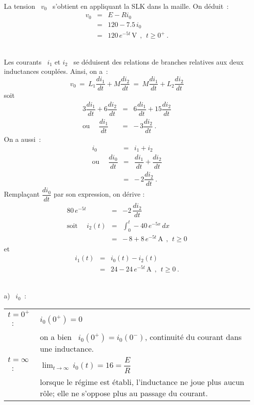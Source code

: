 \newpage

\\
La tension \ $v_0$ \ s'obtient en appliquant la SLK dans la maille. On déduit~:
\begin{eqnarray*}
	v_0 &=& E - Ri_0\\
	&=& 120 - 7.5\, i_0\\
	&=& 120 \, e^{-5t} \, \mbox{V}~~,~~t \geq 0^+~. 
\end{eqnarray*}

\\
Les courants \ $i_1$ et $i_2$ \ se déduisent des relations de branches
relatives aux deux inductances couplées. Ainsi, on a~:
\[ v_0 \: = \: L_1 \dfrac{di_1}{dt} + M \dfrac{di_2}{dt} 
\: = \: M \dfrac{di_1}{dt} + L_2 \dfrac{di_2}{dt} \]
soit
\begin{eqnarray*}
	3 \dfrac{di_1}{dt} + 6\dfrac{di_2}{dt} &=&  6\dfrac{di_1}{dt} + 15 \dfrac{di_2}{dt}\\
	\mbox{ou}~~~~~~\dfrac{di_1}{dt} &=& -\, 3 \dfrac{di_2}{dt}~.
\end{eqnarray*}
On a aussi~: 
\begin{eqnarray*}
	i_0 &=& i_1+i_2\\
	\mbox{ou}~~~~~~\dfrac{di_0}{dt} &=& \dfrac{di_1}{dt} + \dfrac{di_2}{dt}\\
	&=& -\, 2 \dfrac{di_2}{dt}~.
\end{eqnarray*}
Remplaçant $\dfrac{di_0}{dt}$ par son expression, on dérive :
\begin{eqnarray*}
	80\,e^{-5t} & =& -2\, \dfrac{di_2}{dt}\\
	\mbox{soit~~~~} i_2(t) &=& \int^t_0 - 40\, e^{-5x}\, dx\\
	&=& -\, 8 + 8\, e^{-5t}\, \text{A}~~, ~~t\geq 0
\end{eqnarray*}
et 
\begin{eqnarray*}
	i_1(t) &=& i_0(t) - i_2(t)\\
	&=& 24 - 24\,  e^{-5t}\, \text{A}~~, ~~t\geq 0~.
\end{eqnarray*}

\newpage

\\
a) \ $i_0$~:
\begin{center}
	\begin{tabular}{lp{8cm}}
		$t=0^+$~: & $i_0(0^+) = 0$~\\ &  on a bien \ $i_0(0^+) = i_0(0^-)$,
		continuité du courant dans une inductance.\\ 
		$t=\infty$~: &
		${\displaystyle \lim_{t\rightarrow\infty}}\, i_0(t) = 16 =
		{\displaystyle \dfrac{E}{R}}$\\ 
		& lorsque le régime est établi,
		l'inductance ne joue plus aucun rôle; elle ne s'oppose plus au passage
		du courant.
	\end{tabular}
\end{center}

